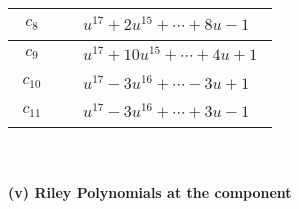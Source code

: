 \documentclass[1p]{elsarticle_modified}
\theoremstyle{definition}
\begin{document}
\begin{tabular}{m{50pt}|m{274pt}}
\hline $$\begin{aligned}c_{8}\end{aligned}$$&$\begin{aligned}
&u^{17}+2 u^{15}+\cdots+8 u-1
\end{aligned}$\\
\hline $$\begin{aligned}c_{9}\end{aligned}$$&$\begin{aligned}
&u^{17}+10 u^{15}+\cdots+4 u+1
\end{aligned}$\\
\hline $$\begin{aligned}c_{10}\end{aligned}$$&$\begin{aligned}
&u^{17}-3 u^{16}+\cdots-3 u+1
\end{aligned}$\\
\hline $$\begin{aligned}c_{11}\end{aligned}$$&$\begin{aligned}
&u^{17}-3 u^{16}+\cdots+3 u-1
\end{aligned}$\\
\hline
\end{tabular}\\~\\
\newpage\renewcommand{\arraystretch}{1}
\flushleft \textbf{(v) Riley Polynomials at the component}\newline \\
\end{document}
